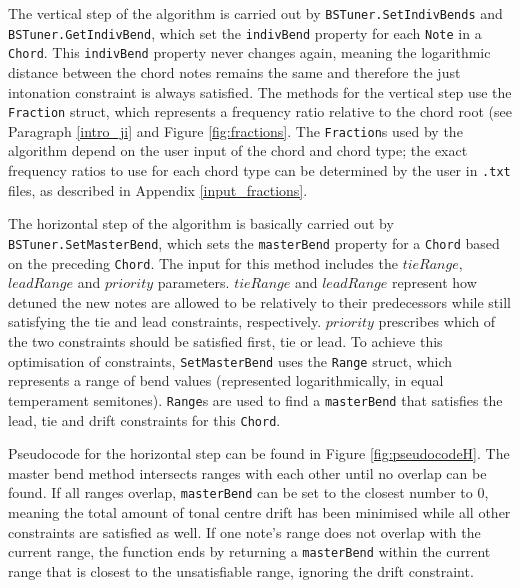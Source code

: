 \documentclass[a4paper]{article}
\begin{document}
\begin{sloppypar}
The vertical step of the algorithm is carried out by \texttt{BSTuner.SetIndivBends} and \texttt{BSTuner.GetIndivBend}, which set the \texttt{indivBend} property for each \texttt{Note} in a \texttt{Chord}. This \texttt{indivBend} property never changes again, meaning the logarithmic distance between the chord notes remains the same and therefore the just intonation constraint is always satisfied. The methods for the vertical step use the \texttt{Fraction} struct, which represents a frequency ratio relative to the chord root (see Paragraph \ref{intro_ji} and Figure \ref{fig:fractions}. The \texttt{Fraction}s used by the algorithm depend on the user input of the chord and chord type; the exact frequency ratios to use for each chord type can be determined by the user in \texttt{.txt} files, as described in Appendix \ref{input_fractions}.

The horizontal step of the algorithm is basically carried out by \texttt{BSTuner.SetMasterBend}, which sets the \texttt{masterBend} property for a \texttt{Chord} based on the preceding \texttt{Chord}. The input for this method includes the $\mathit{tieRange}$, $\mathit{leadRange}$ and $\mathit{priority}$ parameters. $\mathit{tieRange}$ and $\mathit{leadRange}$ represent how detuned the new notes are allowed to be relatively to their predecessors while still satisfying the tie and lead constraints, respectively. $\mathit{priority}$ prescribes which of the two constraints should be satisfied first, tie or lead. To achieve this optimisation of constraints, \texttt{SetMasterBend} uses the \texttt{Range} struct, which represents a range of bend values (represented logarithmically, in equal temperament semitones). \texttt{Range}s are used to find a \texttt{masterBend} that satisfies the lead, tie and drift constraints for this \texttt{Chord}.
\end{sloppypar}

Pseudocode for the horizontal step can be found in Figure \ref{fig:pseudocodeH}. The master bend method intersects ranges with each other until no overlap can be found. If all ranges overlap, \texttt{masterBend} can be set to the closest number to 0, meaning the total amount of tonal centre drift has been minimised while all other constraints are satisfied as well. If one note's range does not overlap with the current range, the function ends by returning a \texttt{masterBend} within the current range that is closest to the unsatisfiable range, ignoring the drift constraint.
\end{document}

